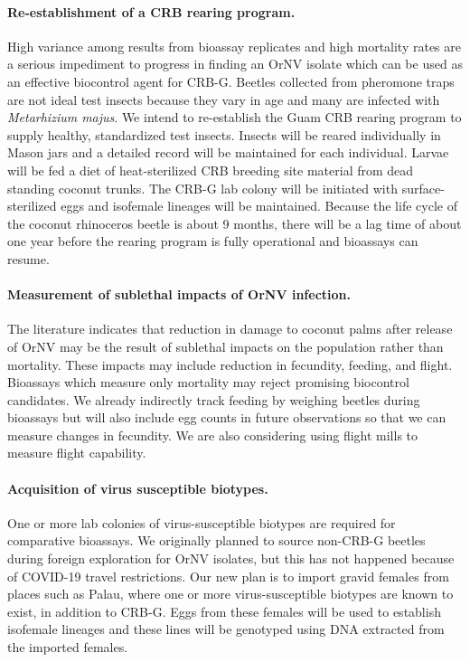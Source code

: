 \documentclass[12pt,letterpaper,english,bibliography=totocnumbered,abstract=on]{scrartcl}
\begin{document}
\paragraph{Re-establishment of a CRB rearing program.} High variance among results from bioassay
replicates and high mortality rates are a serious impediment to progress in finding an
OrNV isolate which can be used as an effective biocontrol agent for CRB-G. Beetles
collected from pheromone traps are not ideal test insects because they vary in age and
many are infected with \textit{Metarhizium majus}.
We intend to re-establish the Guam CRB rearing program to supply healthy, standardized test insects. Insects will be reared individually in Mason jars and a detailed record
will be maintained for each individual. Larvae will be fed a diet of heat-sterilized CRB
breeding site material from dead standing coconut trunks. The CRB-G lab colony will
be initiated with surface-sterilized eggs and isofemale lineages will be maintained.
Because the life cycle of the coconut rhinoceros beetle is about 9 months, there will
be a lag time of about one year before the rearing program is fully operational and bioassays can resume.

\paragraph{Measurement of sublethal impacts of OrNV infection.} The literature indicates
that reduction in damage to coconut palms after release of OrNV may be the result of
sublethal impacts on the population rather than mortality. These impacts may include
reduction in fecundity, feeding, and flight. Bioassays which measure only mortality may
reject promising biocontrol candidates.
We already indirectly track feeding by weighing beetles during bioassays but will also
include egg counts in future observations so that we can measure changes in fecundity. We are also considering using flight mills to measure flight capability.

\paragraph{Acquisition of virus susceptible biotypes.} One or more lab colonies of virus-susceptible biotypes are required for comparative bioassays. We
originally planned to source non-CRB-G beetles during foreign exploration for OrNV
isolates, but this has not happened because of COVID-19 travel restrictions.
Our new plan is to import gravid females from places such as Palau, where one or more
virus-susceptible biotypes are known to exist, in addition to CRB-G. Eggs from these
females will be used to establish isofemale lineages and these lines will be genotyped
using DNA extracted from the imported females.

\clearpage
\printbibliography[heading=bibintoc]
\end{document}

